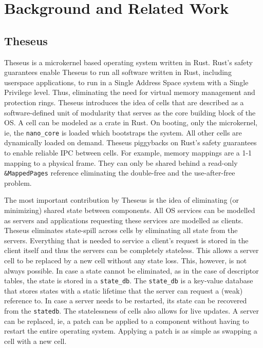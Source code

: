 
\chapter{Background and Related Work}

\label{Chapter2}



\section{Theseus}
Theseus\cite{theseus} is a microkernel based operating system written in Rust. Rust's safety guarantees enable Theseus to run all software written in Rust, including userspace applications, to run in a Single Address Space system with a Single Privilege level. Thus, eliminating the need for virtual memory management and protection rings. Theseus introduces the idea of cells that are described as a software-defined unit of modularity that serves as the core building block of the OS. A cell can be modeled as a crate in Rust. On booting, only the microkernel, ie, the \lstinline{nano_core} is loaded which bootstraps the system. All other cells are dynamically loaded on demand. 
Theseus piggybacks on Rust's safety guarantees to enable reliable IPC between cells. For example, memory mappings are a 1-1 mapping to a physical frame. They can only be shared behind a read-only \lstinline{&MappedPages} reference eliminating the double-free and the use-after-free problem. 

The most important contribution by Theseus is the idea of eliminating (or minimizing) shared state between components. All OS services can be modelled as servers and applications requesting these services are modelled as clients. Theseus eliminates state-spill\cite{state-spill} across cells by eliminating all state from the servers. Everything that is needed to service a client's request is stored in the client itself and thus the servers can be completely stateless. This allows a server cell to be replaced by a new cell without any state loss. This, however, is not always possible. In case a state cannot be eliminated, as in the case of descriptor tables, the state is stored in a \lstinline{state_db}. The \lstinline{state_db} is a key-value database that stores states with a static lifetime that the server can request a (weak) reference to. In case a server needs to be restarted, its state can be recovered from the \lstinline{statedb}. The statelessness of cells also allows for live updates. A server can be replaced, ie, a patch can be applied to a component without having to restart the entire operating system. Applying a patch is as simple as swapping a cell with a new cell.


